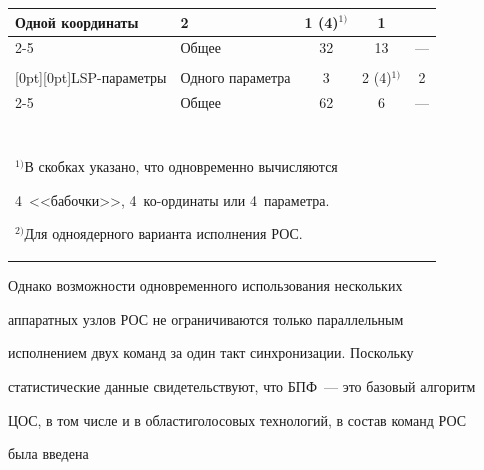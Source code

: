 \begin{table}
\begin{center}
\begin{tabular}{|l|l|c|c|c|}
Одной координаты&2&1 (4)$^{1)}$&1\\


       \cline{2-5}


       &Общее &32&13&---\\


       \hline       


       &&&&\\[-10pt]


\multicolumn{1}{|c|}{\raisebox{-5pt}[0pt][0pt]{LSP-параметры}}&Одного параметра&3&2 (4)$^{1)}$&2\\


       \cline{2-5}


       &Общее &62&6&---\\


       \hline


       \multicolumn{5}{c}{\ }\\[-9pt]


\multicolumn{5}{p{308pt}}{\footnotesize $^{1)}$В скобках указано, что одновременно вычисляются 


4~<<бабочки>>, 4~ко-\linebreak \hphantom{$^{1)}$}ординаты или 4~параметра. \newline


             $^{2)}$Для одноядерного варианта исполнения РОС.}


       \end{tabular}


       \end{center}


       \vspace*{-9pt}


       \end{table}


      


      Однако возможности одновременного использования нескольких 


аппаратных узлов РОС не ограничиваются только параллельным 


исполнением двух команд за один такт синхронизации. Поскольку 


статистические данные свидетельствуют, что БПФ~--- это базовый алгоритм 


ЦОС, в том числе и в об\-ласти\linebreak голосовых технологий, в состав команд РОС 


была введена 


